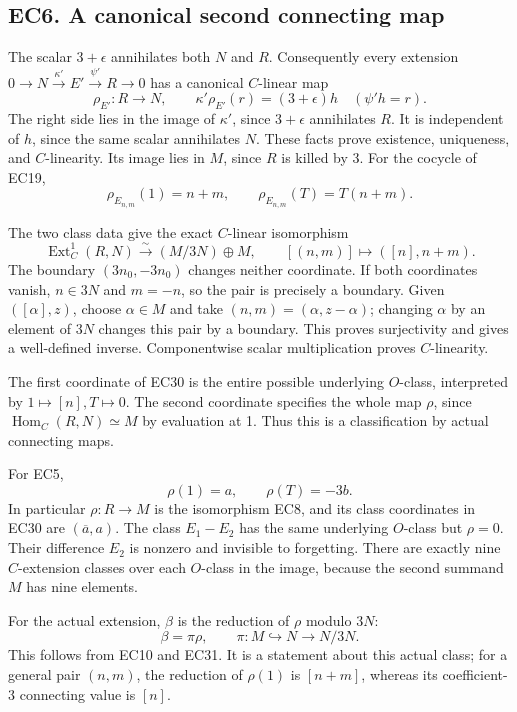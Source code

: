 \documentclass[
  10pt,
  a4paper,
]{article}
\begin{document}
\subsection{EC6. A canonical second connecting
map}\label{ec6.-a-canonical-second-connecting-map}

The scalar \(3+\epsilon\) annihilates both \(N\) and \(R\). Consequently
every extension
\(0\to N\xrightarrow{\kappa'}E'\xrightarrow{\psi'}R\to0\) has a
canonical \(C\)-linear map \[
\rho_{E'}:R\longrightarrow N,\qquad
\kappa'\rho_{E'}(r)=(3+\epsilon)h
\quad(\psi'h=r).
\tag{EC28}
\] The right side lies in the image of \(\kappa'\), since \(3+\epsilon\)
annihilates \(R\). It is independent of \(h\), since the same scalar
annihilates \(N\). These facts prove existence, uniqueness, and
\(C\)-linearity. Its image lies in \(M\), since \(R\) is killed by 3.
For the cocycle of EC19, \[
\rho_{E_{n,m}}(1)=n+m,\qquad
\rho_{E_{n,m}}(T)=T(n+m).
\tag{EC29}
\]

The two class data give the exact \(C\)-linear isomorphism \[
\boxed{
\operatorname{Ext}^1_C(R,N)
\xrightarrow{\sim}(M/3N)\oplus M,\qquad
[(n,m)]\longmapsto([n],n+m).}
\tag{EC30}
\] The boundary \((3n_0,-3n_0)\) changes neither coordinate. If both
coordinates vanish, \(n\in3N\) and \(m=-n\), so the pair is precisely a
boundary. Given \(([\alpha],z)\), choose \(\alpha\in M\) and take
\((n,m)=(\alpha,z-\alpha)\); changing \(\alpha\) by an element of \(3N\)
changes this pair by a boundary. This proves surjectivity and gives a
well-defined inverse. Componentwise scalar multiplication proves
\(C\)-linearity.

The first coordinate of EC30 is the entire possible underlying
\(O\)-class, interpreted by \(1\mapsto[n],T\mapsto0\). The second
coordinate specifies the whole map \(\rho\), since
\(\operatorname{Hom}_C(R,N)\simeq M\) by evaluation at 1. Thus this is a
classification by actual connecting maps.

For EC5, \[
\rho(1)=a,\qquad \rho(T)=-3b.
\tag{EC31}
\] In particular \(\rho:R\to M\) is the isomorphism EC8, and its class
coordinates in EC30 are \((\overline a,a)\). The class \(E_1-E_2\) has
the same underlying \(O\)-class but \(\rho=0\). Their difference \(E_2\)
is nonzero and invisible to forgetting. There are exactly nine
\(C\)-extension classes over each \(O\)-class in the image, because the
second summand \(M\) has nine elements.

For the actual extension, \(\beta\) is the reduction of \(\rho\) modulo
\(3N\): \[
\beta=\pi\rho,\qquad \pi:M\hookrightarrow N\to N/3N.
\tag{EC32}
\] This follows from EC10 and EC31. It is a statement about this actual
class; for a general pair \((n,m)\), the reduction of \(\rho(1)\) is
\([n+m]\), whereas its coefficient-3 connecting value is \([n]\).
\end{document}
